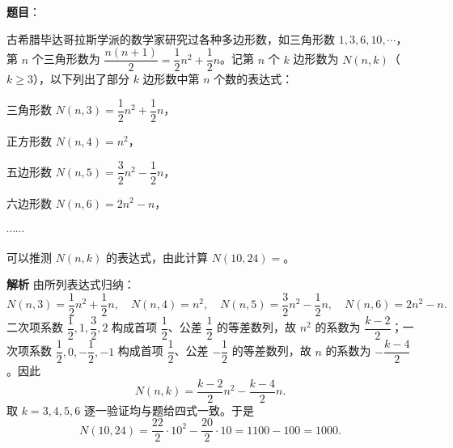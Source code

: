 \begin{answer}

\textbf{题目}：

古希腊毕达哥拉斯学派的数学家研究过各种多边形数，如三角形数 $1,3,6,10,\cdots$，第 $n$ 个三角形数为 $\dfrac{n(n+1)}{2}=\dfrac12n^2+\dfrac12n$。记第 $n$ 个 $k$ 边形数为 $N(n,k)$（$k\geqslant3$），以下列出了部分 $k$ 边形数中第 $n$ 个数的表达式：

三角形数 $N(n,3)=\dfrac12n^2+\dfrac12n$，

正方形数 $N(n,4)=n^2$，

五边形数 $N(n,5)=\dfrac32n^2-\dfrac12n$，

六边形数 $N(n,6)=2n^2-n$，

$\cdots\cdots$

可以推测 $N(n,k)$ 的表达式，由此计算 $N(10,24)=$\gkblank{}。

\textbf{解析}
由所列表达式归纳：
\nopagebreak[4]
\[N(n,3)=\frac12n^2+\frac12n,\quad
N(n,4)=n^2,\quad
N(n,5)=\frac32n^2-\frac12n,\quad
N(n,6)=2n^2-n.\]
二次项系数 $\dfrac12,1,\dfrac32,2$ 构成首项 $\dfrac12$、公差 $\dfrac12$ 的等差数列，故 $n^2$ 的系数为 $\dfrac{k-2}{2}$；一次项系数 $\dfrac12,0,-\dfrac12,-1$ 构成首项 $\dfrac12$、公差 $-\dfrac12$ 的等差数列，故 $n$ 的系数为 $-\dfrac{k-4}{2}$。因此
\nopagebreak[4]
\[N(n,k)=\frac{k-2}{2}n^2-\frac{k-4}{2}n.\]
取 $k=3,4,5,6$ 逐一验证均与题给四式一致。于是
\nopagebreak[4]
\[N(10,24)=\frac{22}{2}\cdot10^2-\frac{20}{2}\cdot10
=1100-100=1000.\]


\end{answer}
